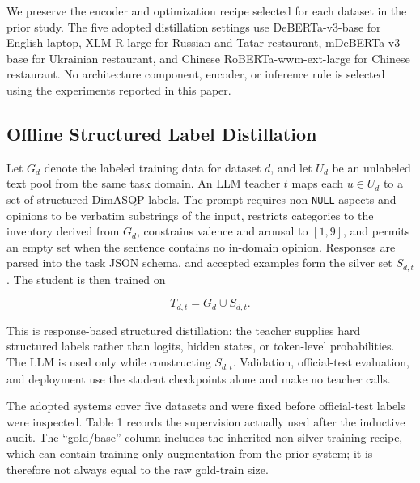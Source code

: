 We preserve the encoder and optimization recipe selected for each
dataset in the prior study. The five adopted distillation settings use
DeBERTa-v3-base for English laptop, XLM-R-large for Russian and Tatar
restaurant, mDeBERTa-v3-base for Ukrainian restaurant, and Chinese
RoBERTa-wwm-ext-large for Chinese restaurant. No architecture component,
encoder, or inference rule is selected using the experiments reported in
this paper.

\subsection{Offline Structured Label
Distillation}\label{offline-structured-label-distillation}

Let \(G_d\) denote the labeled training data for dataset \(d\), and let
\(U_d\) be an unlabeled text pool from the same task domain. An LLM
teacher \(t\) maps each \(u\in U_d\) to a set of structured DimASQP
labels. The prompt requires non-\texttt{NULL} aspects and opinions to be
verbatim substrings of the input, restricts categories to the inventory
derived from \(G_d\), constrains valence and arousal to \([1,9]\), and
permits an empty set when the sentence contains no in-domain opinion.
Responses are parsed into the task JSON schema, and accepted examples
form the silver set \(S_{d,t}\). The student is then trained on

\[
T_{d,t}=G_d\cup S_{d,t}.
\]

This is response-based structured distillation: the teacher supplies
hard structured labels rather than logits, hidden states, or token-level
probabilities. The LLM is used only while constructing \(S_{d,t}\).
Validation, official-test evaluation, and deployment use the student
checkpoints alone and make no teacher calls.

The adopted systems cover five datasets and were fixed before
official-test labels were inspected. Table 1 records the supervision
actually used after the inductive audit. The ``gold/base'' column
includes the inherited non-silver training recipe, which can contain
training-only augmentation from the prior system; it is therefore not
always equal to the raw gold-train size.

